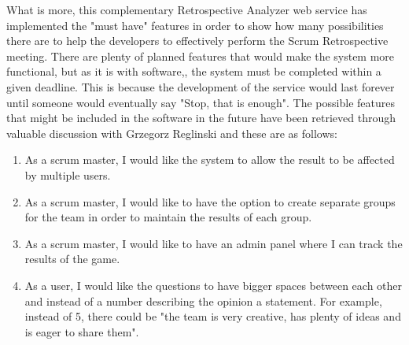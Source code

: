 What is more, this complementary Retrospective Analyzer web service has implemented the "must have" features in order to show how many possibilities there are to help the developers to effectively perform the Scrum Retrospective meeting. There are plenty of planned features that would make the system more functional, but as it is with software,, the system must be completed within a given deadline. This is because the development of the service would last forever until someone would eventually say "Stop, that is enough". The possible features that might be included in the software in the future have been retrieved through valuable discussion with Grzegorz Reglinski and these are as follows:
\begin{enumerate}
    \item As a scrum master, I would like the system to allow the result to be affected by multiple users.
    \item As a scrum master, I would like to have the option to create separate groups for the team in order to maintain the results of each group.
    \item As a scrum master, I would like to have an admin panel where I can track the results of the game.
    \item As a user, I would like the questions to have bigger spaces between each other and instead of a number describing the opinion a statement. For example, instead of 5, there could be "the team is very creative, has plenty of ideas and is eager to share them".
\end{enumerate}



